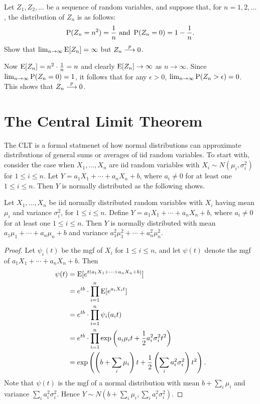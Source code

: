\begin{example}
Let $Z_1, Z_2, \ldots$ be a sequence of random variables, and suppose that,
for $n = 1, 2, \ldots$, the distribution of $Z_n$ is as follows:
\[
    \operatorname{P} (Z_n = n^2) = \frac{1}{n} \text{ and } \operatorname{P} (Z_n = 0) = 1 - \frac{1}{n}.
\] 
Show that $\lim_{n \to \infty} \operatorname{E} [Z_n] = \infty$ but $Z_n \stackrel{p}{\longrightarrow} 0$.
\begin{solution}
Now $\operatorname{E} [Z_n] = n^2 \cdot \frac{1}{n} = n$ and clearly $\operatorname{E} [Z_n] \to \infty$
as $n \to \infty$. Since $\lim_{n \to \infty} \operatorname{P} (Z_n = 0) = 1$, it follows 
that for any $\epsilon > 0$, $\lim_{n \to \infty} \operatorname{P} (Z_n > \epsilon) = 0$. 
This shows that $Z_n \stackrel{p}{\longrightarrow} 0$.
\end{solution}
\eop 
\end{example}

\section{The Central Limit Theorem}

The CLT is a formal statmenet of how normal distributions can approximate 
distributions of general sums or averages of iid random variables. To start with,
consider the case when $X_1, \ldots, X_n$ are iid random variables with 
$X_i \sim N(\mu_i, \sigma_i^2)$ for $1 \leq i \leq n$. Let $Y = a_1 X_1 + \cdots 
+ a_n X_n + b$, where $a_i \neq 0$ for at least one $1 \leq i \leq n$. Then $Y$ is 
normally distributed as the following shows.

\begin{theorem}
Let $X_1, \ldots, X_n$ be iid normally distributed random variables with $X_i$ 
having mean $\mu_i$ and variance $\sigma_i^2$, for $1 \leq i \leq n$. Define 
$Y = a_1 X_1 + \cdots + a_n X_n + b$, where $a_i \neq 0$ for at least 
one $1 \leq i \leq n$. Then $Y$ is normally distributed with mean 
$a_1 \mu_1 + \cdots + a_n \mu_n + b$ and variance 
$a_1^2 \mu_1^2 + \cdots + a_n^2 \mu_n^2$.  
\end{theorem}
\begin{proof}
Let $\psi_i (t)$ be the mgf of $X_i$ for $1 \leq i \leq n$, and let 
$\psi (t)$ denote the mgf of $a_1 X_1 + \cdots + a_n X_n + b$. Then 
\begin{align*}
	\psi (t) & = \operatorname{E} [ e^{t (a_1 X_1 + \cdots + a_n X_n + b)}] \\
			 & = e^{t b} \cdot \prod_{i = 1}^{n} \operatorname{E} [e^{a_i X_i t}] \\
			 & = e^{t b} \cdot \prod_{i = 1}^{n} \psi_i (a_i t) \\ 
			 & = e^{t b} \cdot \prod_{i = 1}^{n} 
			 		\exp \left ( a_i \mu_i t + \frac{1}{2} a_i^2 \sigma_i^2 t^2 
			 		     \right ) \\
			 & = \exp \left ( \left ( b + \sum_i \mu_i \right ) t + 
							  \frac{1}{2} \left ( \sum_i a_i^2 \sigma_i^2 \right ) t^2 
					  \right ). 
\end{align*}
Note that $\psi (t)$ is the mgf of a normal distribution with mean $b + \sum_i \mu_i$
and variance $\sum_i a_i^2 \sigma_i^2$. Hence 
$Y \sim N(b + \sum_i \mu_i, \sum_i a_i^2 \sigma_i^2)$.
\end{proof}

